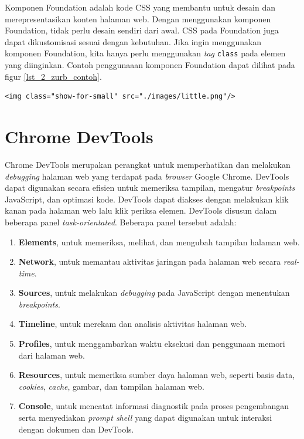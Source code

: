 Komponen Foundation adalah kode CSS  yang membantu untuk desain dan merepresentasikan konten halaman web. Dengan menggunakan komponen Foundation, tidak perlu desain sendiri dari awal. CSS pada Foundation juga dapat dikustomisasi sesuai dengan kebutuhan. Jika ingin menggunakan komponen Foundation, kita hanya perlu menggunakan \textit{tag} \verb!class! pada elemen yang diinginkan. Contoh penggunaaan komponen Foundation dapat dilihat pada figur \ref{lst_2_zurb_contoh}.

\begin{lstlisting}[caption=Menggunakan kelas yang sudah disediakan dari Foundation,label = {lst_2_zurb_contoh}]
	<img class="show-for-small" src="./images/little.png"/>
\end{lstlisting}

\section{Chrome DevTools}
\label{sec:devtools}
Chrome DevTools\cite{devtools} merupakan perangkat untuk memperhatikan dan melakukan \textit{debugging} halaman web yang terdapat pada \textit{browser} Google Chrome. DevTools dapat digunakan secara efisien untuk memeriksa tampilan, mengatur \textit{breakpoints} JavaScript, dan optimasi kode. DevTools dapat diakses dengan melakukan klik kanan pada halaman web lalu klik periksa elemen. DevTools disusun dalam beberapa panel \textit{task-orientated}. Beberapa panel tersebut adalah:

\begin{enumerate}
	\item \textbf{Elements}, untuk memeriksa, melihat, dan mengubah tampilan halaman web.
	\item \textbf{Network}, untuk memantau aktivitas jaringan pada halaman web secara \textit{real-time}.
	\item \textbf{Sources}, untuk melakukan \textit{debugging} pada JavaScript dengan menentukan \textit{breakpoints}.
	\item \textbf{Timeline}, untuk merekam dan analisis aktivitas halaman web.
	\item \textbf{Profiles}, untuk menggambarkan waktu eksekusi dan penggunaan memori dari halaman web.
	\item \textbf{Resources}, untuk memeriksa sumber daya halaman web, seperti basis data, \textit{cookies}, \textit{cache}, gambar, dan tampilan halaman web.
	\item \textbf{Console}, untuk mencatat informasi diagnostik pada proses pengembangan serta menyediakan \textit{prompt shell} yang dapat digunakan untuk interaksi dengan dokumen dan DevTools.
\end{enumerate}

